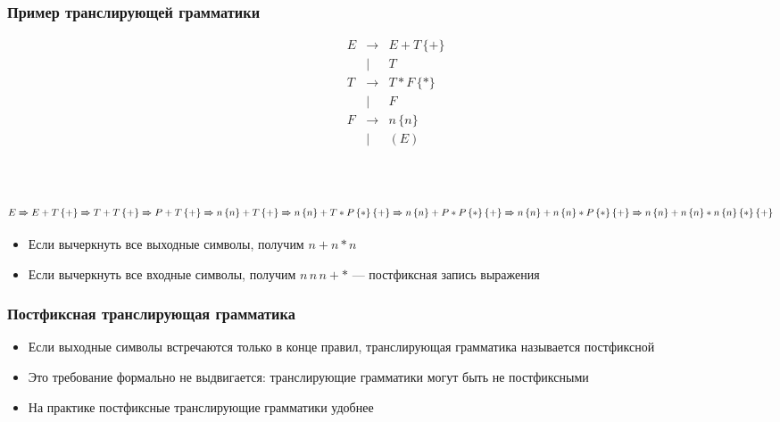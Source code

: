 \documentclass{beamer}
\newcommand{\derives}[0]{\xRightarrow[]{}}
\begin{document}
\begin{frame}[fragile]
  \transwipe[direction=90]
  \frametitle{Пример транслирующей грамматики}
$$
\begin{array}{cccl}
&E& \rightarrow & E + T \, \{ + \} \\
& &    |        & T   \\
&T& \rightarrow & T * F \, \{ * \} \\
& &    |        & F  \\
&F& \rightarrow & n \, \{ n \} \\
& &    |        & ( E ) \\
\end{array}
$$
\pause ~\\~

$E \derives E + T \, \{ + \} \derives T + T \, \{ + \} \derives P + T \, \{ + \} \derives n \, \{ n \} + T \, \{ + \} \derives n \, \{ n \} + T * P \, \{ * \} \, \{ + \} \derives n \, \{ n \} + P * P \, \{ * \} \, \{ + \} \derives n \, \{ n \} +  n \, \{ n \} * P \, \{ * \} \, \{ + \} \derives n \, \{ n \} +  n \, \{ n \} * n \, \{ n \} \, \{ * \} \, \{ + \}$

\pause
\begin{itemize}
  \item Если вычеркнуть все выходные символы, получим $n + n * n$
  \item Если вычеркнуть все входные символы, получим $n \, n \, n + *$ --- постфиксная запись выражения
\end{itemize}
\end{frame}


\begin{frame}[fragile]
  \transwipe[direction=90]
  \frametitle{Постфиксная транслирующая грамматика}
  \begin{itemize}
    \item Если выходные символы встречаются только в конце правил, транслирующая грамматика называется постфиксной
    \item Это требование формально не выдвигается: транслирующие грамматики могут быть не постфиксными
    \item На практике постфиксные транслирующие грамматики удобнее
  \end{itemize}
\end{frame}
\end{document}
